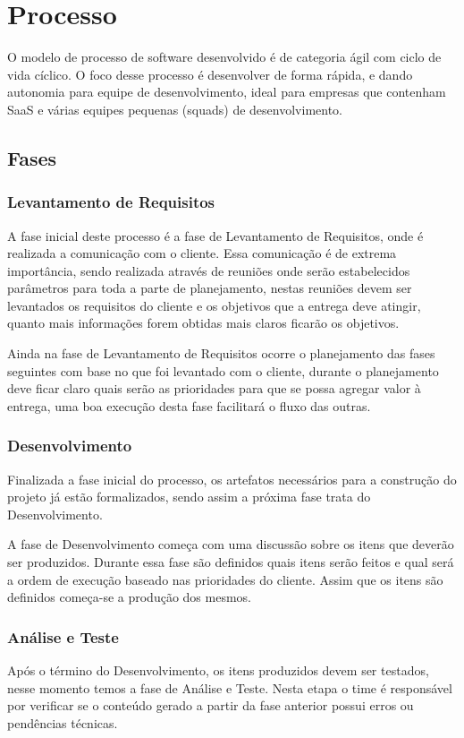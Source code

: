 \documentclass[	DIV=calc,%
							paper=a4,%
							fontsize=12pt,%
							onecolumn]{scrartcl}	 					%
\begin{document}
\section{Processo}
O modelo de processo de software desenvolvido é de categoria ágil com ciclo de vida cíclico. O foco desse processo é desenvolver de forma rápida, e dando autonomia para equipe de desenvolvimento, ideal para empresas que contenham SaaS e várias equipes pequenas (squads) de desenvolvimento.

\subsection{Fases}
	\subsubsection{Levantamento de Requisitos}
	A fase inicial deste processo é a fase de Levantamento de Requisitos, onde é realizada a comunicação com o cliente. Essa comunicação é de extrema importância, sendo realizada através de reuniões onde serão estabelecidos parâmetros para toda a parte de planejamento, nestas reuniões devem ser levantados os requisitos do cliente e os objetivos que a entrega deve atingir, quanto mais informações forem obtidas mais claros ficarão os objetivos. 
	
	Ainda na fase de Levantamento de Requisitos ocorre o planejamento das fases seguintes com base no que foi levantado com o cliente, durante o planejamento deve ficar claro quais serão as prioridades para que se possa agregar valor à entrega, uma boa execução desta fase facilitará o fluxo das outras. 
	
	\subsubsection{Desenvolvimento}
	Finalizada a fase inicial do processo, os artefatos necessários para a construção do projeto já estão formalizados, sendo assim a próxima fase trata do Desenvolvimento. 
	
	A fase de Desenvolvimento começa com uma discussão sobre os itens que deverão ser produzidos. Durante essa fase são definidos quais itens serão feitos e qual será a ordem de execução baseado nas prioridades do cliente. Assim que os itens são definidos começa-se a produção dos mesmos. 
	
	\subsubsection{Análise e Teste}
	 Após o término do Desenvolvimento, os itens produzidos devem ser testados, nesse momento temos a fase de Análise e Teste. Nesta etapa o time é responsável por verificar se o conteúdo gerado a partir da fase anterior possui erros ou pendências técnicas. 
	
\end{document}
